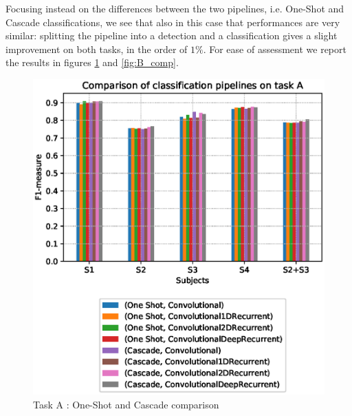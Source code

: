 Focusing instead on the differences between the two pipelines, i.e. One-Shot and Cascade classifications, we see that also in this case that performances are very similar: splitting the pipeline into a detection and a classification gives a slight improvement on both tasks, in the order of $1\%$. For ease of assessment we report the results in figures \ref{fig:A_comp} and \ref{fig:B_comp}.
\begin{figure}[t]
	\centering
	\includegraphics[scale=.6]{figure/A_pipeline_comparison}
	\caption{Task A : One-Shot and Cascade comparison}
	\label{fig:A_comp}
\end{figure}
